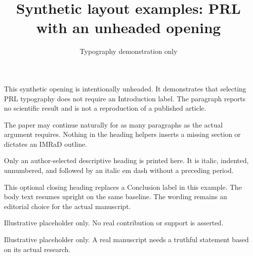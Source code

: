 \documentclass[aps,prl,reprint]{revtex4-2}
\begin{document}
\title{Synthetic layout examples: PRL with an unheaded opening}
\author{Typography demonstration only}\noaffiliation
\maketitle
This synthetic opening is intentionally unheaded. It demonstrates that selecting PRL typography does not require an Introduction label. The paragraph reports no scientific result and is not a reproduction of a published article.

The paper may continue naturally for as many paragraphs as the actual argument requires. Nothing in the heading helpers inserts a missing section or dictates an IMRaD outline.

Only an author-selected descriptive heading is printed here. It is italic, indented, unnumbered, and followed by an italic em dash without a preceding period.

This optional closing heading replaces a Conclusion label in this example. The body text resumes upright on the same baseline. The wording remains an editorial choice for the actual manuscript.

\begin{acknowledgments}
Illustrative placeholder only. No real contribution or support is asserted.
\end{acknowledgments}
Illustrative placeholder only. A real manuscript needs a truthful statement based on its actual research.
\end{document}
